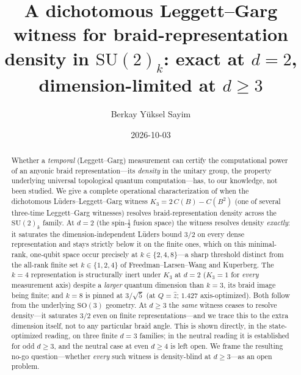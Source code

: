 \documentclass[aps,prx,reprint,amsmath,amssymb,floatfix,nofootinbib,superscriptaddress]{revtex4-2}
\begin{document}
\setcounter{secnumdepth}{3} %

\title{A dichotomous Leggett--Garg witness for braid-representation density in
$\mathrm{SU}(2)_k$: exact at $d=2$, dimension-limited at $d \ge 3$}

\author{Berkay Y\"uksel Sayim}

\date{2026-10-03}

\begin{abstract}
Whether a \emph{temporal} (Leggett--Garg) measurement can certify the computational
power of an anyonic braid representation---its \emph{density} in the unitary group,
the property underlying universal topological quantum computation---has, to our
knowledge, not been studied. We give a complete operational characterization of when the dichotomous
L\"uders--Leggett--Garg witness $K_3 = 2\,C(B) - C(B^2)$ (one of several three-time Leggett--Garg witnesses) resolves braid-representation density across the $\mathrm{SU}(2)_k$ family. At $d=2$ (the spin-$\tfrac12$ fusion
space) the witness resolves density \emph{exactly}: it saturates the
dimension-independent L\"uders bound $3/2$ on every dense representation and stays
strictly below it on the finite ones, which on this minimal-rank, one-qubit space
occur precisely at $k \in \{2,4,8\}$---a sharp threshold distinct from the all-rank
finite set $k \in \{1,2,4\}$ of Freedman--Larsen--Wang and Kuperberg. The $k=4$ representation is structurally inert under $K_3$ at $d=2$ ($K_3 = 1$ for \emph{every} measurement axis) despite a \emph{larger} quantum dimension than $k=3$,
its braid image being finite; and $k=8$ is pinned at $3/\sqrt5$ (at $Q=\hat z$; $1.427$
axis-optimized). Both follow from the
underlying $\mathrm{SO}(3)$ geometry. At $d \ge 3$ the \emph{same} witness ceases to
resolve density---it saturates $3/2$ even on finite representations---and we trace
this to the extra dimension itself, not to any particular braid angle. This is shown directly, in the state-optimized reading, on three finite $d=3$ families; in the neutral reading it is established for odd $d\ge3$, and the neutral case at even $d\ge4$ is left open. We frame the
resulting no-go question---whether \emph{every} such witness is density-blind at
$d \ge 3$---as an open problem.
\end{abstract}

\maketitle
\end{document}
